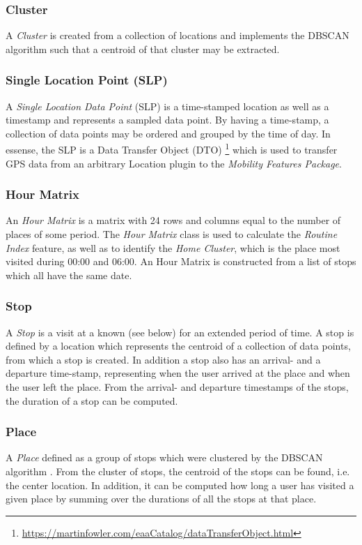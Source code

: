 \subsubsection*{Cluster}
A \textit{Cluster} is created from a collection of locations and implements the DBSCAN algorithm \cite{density-based-1996} such that a centroid of that cluster may be extracted.

\subsubsection*{Single Location Point (SLP)}
A \textit{Single Location Data Point} (SLP) is a time-stamped location as well as a timestamp and represents a sampled data point. By having a time-stamp, a collection of data points may be ordered and grouped by the time of day. In essense, the SLP is a Data Transfer Object (DTO) \footnote{\url{https://martinfowler.com/eaaCatalog/dataTransferObject.html}} which is used to transfer GPS data from an arbitrary Location plugin to the \textit{Mobility Features Package}.

\subsubsection*{Hour Matrix}
An \textit{Hour Matrix} is a matrix with 24 rows and columns equal to the number of places of some period. The \textit{Hour Matrix} class is used to calculate the \textit{Routine Index} feature, as well as to identify the \textit{Home Cluster}, which is the place most visited during 00:00 and 06:00. An Hour Matrix is constructed from a list of stops which all have the same date.

\subsubsection*{Stop}
A \textit{Stop} is a visit at a known  (see below) for an extended period of time. A stop is defined by a location which represents the centroid of a collection of data points, from which a stop is created. In addition a stop also has an arrival- and a departure time-stamp, representing when the user arrived at the place and when the user left the place. From the arrival- and departure timestamps of the stops, the duration of a stop can be computed.

\subsubsection*{Place}
A \textit{Place} defined as a group of stops which were clustered by the DBSCAN algorithm \cite{density-based-1996}. From the cluster of stops, the centroid of the stops can be found, i.e. the center location. In addition, it can be computed how long a user has visited a given place by summing over the durations of all the stops at that place.

